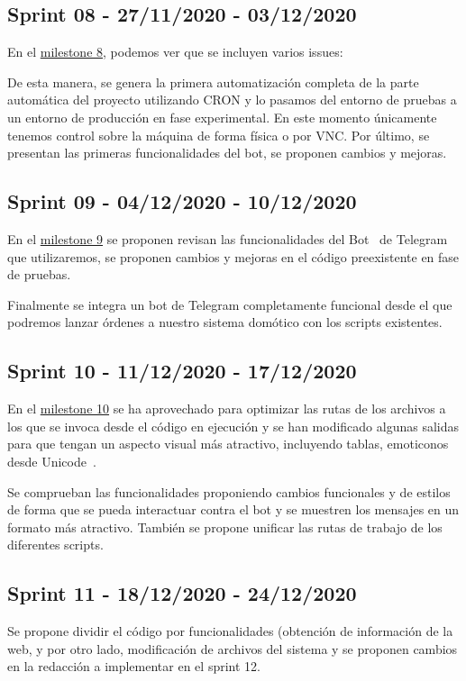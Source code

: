 \subsection{Sprint 08 - 27/11/2020 - 03/12/2020}
En el \href{https://github.com/davidelinformatico/TFG/milestone/8?closed=1}{milestone 8}, podemos ver que se incluyen varios issues:

De esta manera, se genera la primera automatización completa de la parte automática del proyecto utilizando CRON y lo pasamos del entorno de pruebas a un entorno de producción en fase experimental. En este momento únicamente tenemos control sobre la máquina de forma física o por VNC.
Por último, se presentan las primeras funcionalidades del bot, se proponen cambios y mejoras.

\subsection{Sprint 09 - 04/12/2020 - 10/12/2020}
En el \href{https://github.com/davidelinformatico/TFG/milestone/9?closed=1}{milestone 9} se proponen revisan las funcionalidades del Bot~\cite{misc:TelegramApi} de Telegram~\cite{misc:TelegramApp} que utilizaremos, se proponen cambios y mejoras en el código preexistente en fase de pruebas.

Finalmente se integra un bot de Telegram completamente funcional desde el que podremos lanzar órdenes a nuestro sistema domótico con los scripts existentes.

\subsection{Sprint 10 - 11/12/2020 - 17/12/2020}
En el \href{https://github.com/davidelinformatico/TFG/milestone/10?closed=1}{milestone 10} se ha aprovechado para optimizar las rutas de los archivos a los que se invoca desde el código en ejecución y se han modificado algunas salidas para que tengan un aspecto visual más atractivo, incluyendo tablas, emoticonos desde Unicode~\cite{misc:UnicodeWikipedia}.

Se comprueban las funcionalidades proponiendo cambios funcionales y de estilos de forma que se pueda interactuar contra el bot y se muestren los mensajes en un formato más atractivo. También se propone unificar las rutas de trabajo de los diferentes scripts.



\subsection{Sprint 11 - 18/12/2020 - 24/12/2020}
Se propone dividir el código por funcionalidades (obtención de información de la web, y por otro lado, modificación de archivos del sistema y se proponen cambios en la redacción a implementar en el sprint 12.


